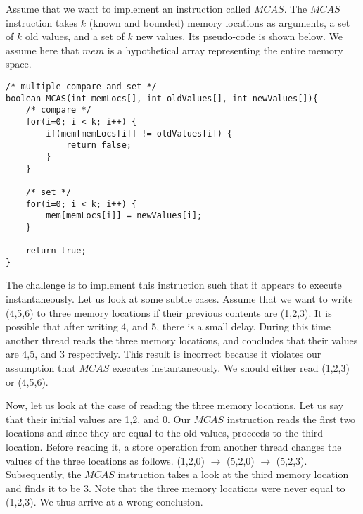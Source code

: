 \begin{ExerciseList}
\Exercise[difficulty=2]
Assume that we want to implement an instruction called $MCAS$. The $MCAS$ instruction
takes $k$ (known and bounded) memory locations as arguments, a set of $k$ old values,
and a set of $k$ new values. Its pseudo-code is shown below. We assume here
that $mem$ is a hypothetical array representing the entire memory space.

\begin{Verbatim}
/* multiple compare and set */
boolean MCAS(int memLocs[], int oldValues[], int newValues[]){
	/* compare */
	for(i=0; i < k; i++) {
		if(mem[memLocs[i]] != oldValues[i]) {
			return false;
		}
	}

	/* set */
	for(i=0; i < k; i++) {
		mem[memLocs[i]] = newValues[i];		
	}
	
	return true;
}
\end{Verbatim} 
The challenge is to implement this instruction such that it appears to execute instantaneously.
Let us look at some subtle cases. Assume that we want to write (4,5,6) to three memory locations
if their previous contents are (1,2,3). It is possible that after writing 4, and 5, there is a 
small delay. During this time another thread reads the three memory locations, and 
concludes that their values are 4,5, and 3 respectively. This result is incorrect because it violates
our assumption that $MCAS$ executes instantaneously. We should either read (1,2,3) or (4,5,6).

Now, let us look at the case of reading the three memory locations. Let us say that their
initial values are 1,2, and 0. Our $MCAS$ instruction reads the first two locations and 
since they are equal to the old values, proceeds to the third location. Before reading it,
a store operation from another thread changes the values of the three locations as follows.
(1,2,0) $\rightarrow$ (5,2,0) $\rightarrow$ (5,2,3). Subsequently, the $MCAS$ instruction
takes a look at the third memory location and finds it to be 3. Note that the three memory
locations were never equal to (1,2,3). We thus arrive at a wrong conclusion.


\end{ExerciseList}
